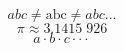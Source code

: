 \documentclass{article}
\begin{document}
\[ abc \not= \mathrm{abc} \not= \mathit{abc} \ldots\]
\[ \pi \approx 3.1415\;926 \]
\[ a \cdot b \cdot c \cdot\cdot\cdot \]
\end{document}
